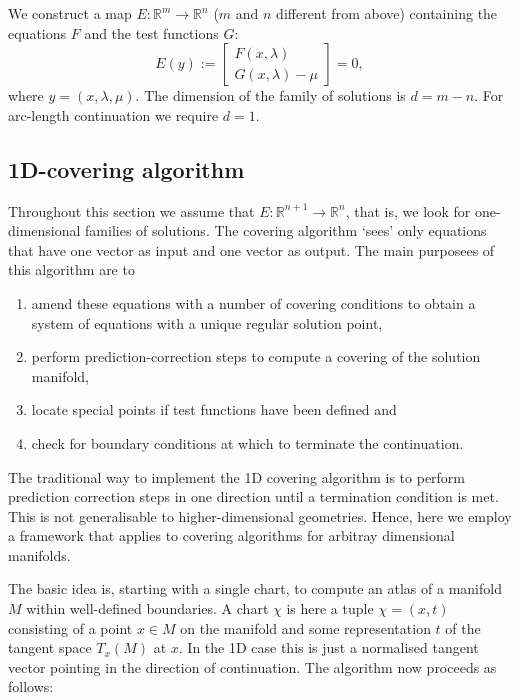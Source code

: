 \documentclass[twoside,draft,a4paper]{article}
\newcommand{\R}{{\mathbb R}}
\begin{document}
We construct a map $E:\R^m\to\R^n$ ($m$ and $n$ different from above) containing the equations $F$ and the test functions $G$:
\begin{equation*}
E(y):=\left[\begin{array}{l}
F(x,\lambda) \\
G(x,\lambda)-\mu
\end{array}\right] = 0,
\end{equation*}
where $y=(x,\lambda,\mu)$. The dimension of the family of solutions is $d=m-n$. For arc-length continuation we require $d=1$.

\subsection{1D-covering algorithm}

Throughout this section we assume that $E:\R^{n+1}\to\R^n$, that is, we look for one-dimensional families of solutions. The covering algorithm `sees' only equations that have one vector as input and one vector as output. The main purposees of this algorithm are to
%
\begin{enumerate}
\item amend these equations with a number of covering conditions to obtain a system of equations with a unique regular solution point,
\item perform prediction-correction steps to compute a covering of the solution manifold,
\item locate special points if test functions have been defined and
\item check for boundary conditions at which to terminate the continuation.
\end{enumerate}
%
The traditional way to implement the 1D covering algorithm is to perform prediction correction steps in one direction until a termination condition is met. This is not generalisable to higher-dimensional geometries. Hence, here we employ a framework that applies to covering algorithms for arbitray dimensional manifolds.

The basic idea is, starting with a single chart, to compute an atlas of a manifold $M$ within well-defined boundaries. A chart $\chi$ is here a tuple $\chi=(x,t)$ consisting of a point $x\in M$ on the manifold and some representation $t$ of the tangent space $T_x(M)$ at $x$. In the 1D case this is just a normalised tangent vector pointing in the direction of continuation. The algorithm now proceeds as follows:
\end{document}
